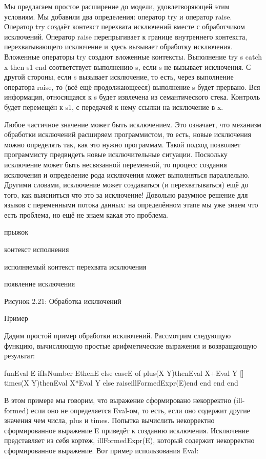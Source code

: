 Мы предлагаем простое расширение до модели, удовлетворяющей этим условиям. Мы добавили два определения: оператор try и оператор raise. Оператор try создаёт контекст перехвата исключений вместе с обработчиком исключений. Оператор raise перепрыгивает к границе внутреннего контекста, перехватывающего исключение и здесь вызывает обработку исключения. Вложенные операторы try создают вложенные контексты. Выполнение try s catch x then s1 end соответствует выполнению s, если s не вызывает исключения. С другой стороны, если s вызывает исключение, то есть, через выполнение оператора raise, то (всё ещё продолжающееся) выполнение s будет прервано. Вся информация, относящаяся к s будет извлечена из семантического стека. Контроль будет перемещён к s1, с передачей к нему ссылки на исключение в x.

Любое частичное значение может быть исключением. Это означает, что механизм обработки исключений расширяем программистом, то есть, новые исключения можно определять так, как это нужно программам. Такой подход позволяет программисту предвидеть новые исключительные ситуации. Поскольку исключение может быть несвязанной переменной, то процесс создания исключения и определение рода исключения может выполняться параллельно. Другими словами, исключение может создаваться (и перехватываться) ещё до того, как выясниться что это за исключение! Довольно разумное решение для языков с переменными потока данных: на определённом этапе мы уже знаем что есть проблема, но ещё не знаем какая это проблема.

прыжок

контекст исполнения

исполняемый контекст перехвата исключения

появление исключения

Рисунок 2.21: Обработка исключений

Пример

Дадим простой пример обработки исключений. Рассмотрим следующую функцию, вычисляющую простые арифметические выражения и возвращающую результат:

fun{Eval E}
if{IsNumber E}thenE
else
caseE
of plus(X Y)then{Eval X}+{Eval Y}
[] times(X Y)then{Eval X}*{Eval Y}
else raiseillFormedExpr(E)end
end
end
end

В этом примере мы говорим, что выражение сформировано некорректно (ill-formed) если оно не определяется Eval-ом, то есть, если оно содержит другие значения чем числа, plus и times. Попытка вычислить некорректно сформированное выражение E приведёт к созданию исключения. Исключение представляет из себя кортеж, illFormedExpr(E), который содержит некорректно сформированное выражение. Вот пример использования Eval:

